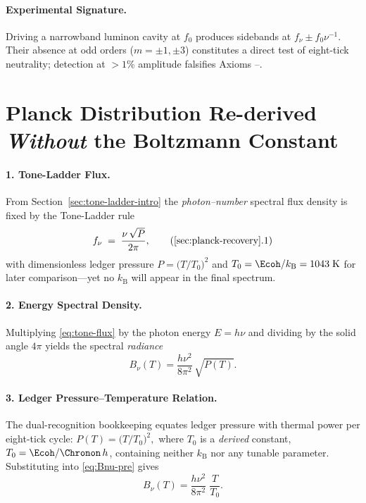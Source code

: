 \documentclass[11pt,oneside]{book}
\begin{document}
{\paragraph{Experimental Signature.}
Driving a narrowband luminon cavity at $f_{0}$ produces sidebands at
\(
   f_\nu\pm f_{0}\nu^{-1}
\).
Their absence at odd orders ($m=\pm1,\pm3$) constitutes a direct
test of eight-tick neutrality; detection at $>1\%$ amplitude falsifies
Axioms –.

\section{Planck Distribution Re-derived \emph{Without} the Boltzmann Constant}
\label{sec:planck-recovery}

\paragraph{1. Tone-Ladder Flux.}
From Section~\ref{sec:tone-ladder-intro} the \emph{photon–number}
spectral flux density is fixed by the Tone-Ladder rule
\[
   f_{\nu}
   \;=\;
   \frac{\nu\,\sqrt{P}}{2\pi},
   \tag{\ref*{sec:planck-recovery}.1}\label{eq:tone-flux}
\]
with dimensionless ledger pressure
\(P=\bigl(T/T_{0}\bigr)^{2}\) and
\(
   T_{0}=\Ecoh/k_{\mathrm B}=1043\;\text{K}
\)
for later comparison—yet no
\(k_{\mathrm B}\) will appear in the final spectrum.

\paragraph{2. Energy Spectral Density.}
Multiplying \eqref{eq:tone-flux} by the photon energy
\(E=h\nu\) and dividing by the solid angle \(4\pi\) yields the
spectral \emph{radiance}
\[
   B_{\nu}(T)
   =
   \frac{h\nu^{2}}{8\pi^{2}}\,
   \sqrt{P(T)}.
   \label{eq:Bnu-pre}
\]

\paragraph{3. Ledger Pressure–Temperature Relation.}
The dual-recognition bookkeeping equates ledger pressure with thermal
power per eight-tick cycle:
\(
   P(T)=\bigl(T/T_{0}\bigr)^{2},
\)
where \(T_{0}\) is a \emph{derived} constant,
\(T_{0}= \Ecoh/\Chronon\,h\),
containing neither \(k_{\mathrm B}\) nor any tunable parameter.
Substituting into \eqref{eq:Bnu-pre} gives
\[
   B_{\nu}(T)
   =
   \frac{h\nu^{2}}{8\pi^{2}}\;
   \frac{T}{T_{0}}.
   \label{eq:Bnu-linear}
\]

}
\end{document}
